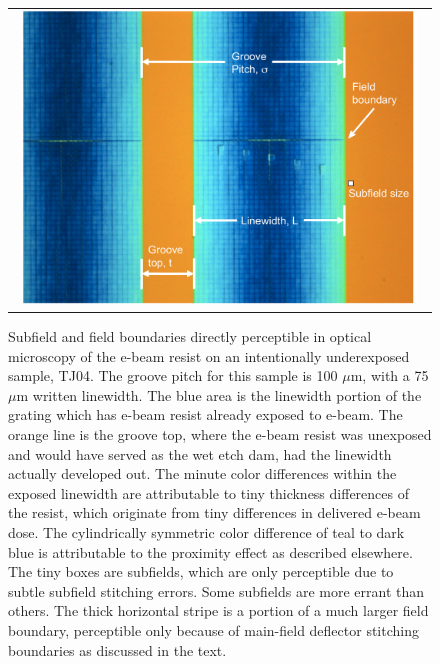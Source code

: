 \documentclass[]{spie}  %
\begin{document}
\begin{figure}
\begin{center}
 \begin{tabular}{c}
    \includegraphics[width=0.96\textwidth]{figs/subfields_TJ04_Zeiss.pdf}
   \end{tabular}
  \end{center}
  \caption[TJ04 under Zeiss]{\label{fig:TJ04Zeiss} Subfield and field boundaries directly perceptible in optical microscopy of the e-beam resist on an intentionally underexposed sample, TJ04.  The groove pitch for this sample is 100 $\mu$m, with a 75 $\mu$m written linewidth.  The blue area is the linewidth portion of the grating which has e-beam resist already exposed to e-beam.  The orange line is the groove top, where the e-beam resist was unexposed and would have served as the wet etch dam, had the linewidth actually developed out.  The minute color differences within the exposed linewidth are attributable to tiny thickness differences of the resist, which originate from tiny differences in delivered e-beam dose.  The cylindrically symmetric color difference of teal to dark blue is attributable to the proximity effect as described elsewhere\cite{2005SPIE.5720...68W}.  The tiny boxes are subfields, which are only perceptible due to subtle subfield stitching errors.  Some subfields are more errant than others.  The thick horizontal stripe is a portion of a much larger field boundary, perceptible only because of main-field deflector stitching boundaries as discussed in the text.}
\end{figure}
\end{document}

